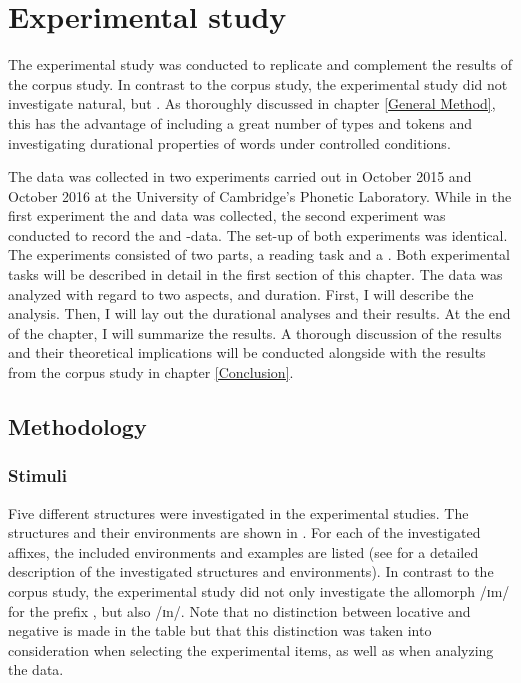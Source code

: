 \chapter{Experimental study} \label{Experimental Studies}


The experimental study was conducted to replicate and complement the results of the corpus study. In contrast to the corpus study, the experimental study did not investigate natural,  but . As thoroughly discussed in chapter \ref{General Method}, this has the advantage of including a great number of types and tokens and investigating durational properties of words under controlled conditions.

 The data was collected in two experiments carried out in October 2015 and October 2016 at the University of Cambridge's Phonetic Laboratory. While in the first experiment the  and data was collected, the second experiment was conducted to record the  and -data. 
  The set-up of both experiments was identical. The experiments consisted of two parts, a reading task and a . 
 Both experimental tasks will be described in detail in the first section of this chapter.
 The data was analyzed with regard to two aspects,  and duration. First, I will describe the  analysis.  Then, I will lay out the durational analyses and their results. At the end of the chapter, I will summarize the results. A thorough discussion of the results and their theoretical implications will be conducted alongside with the results from the corpus study in chapter \ref{Conclusion}.



\section{Methodology}


\subsection{Stimuli} \label{stimuli experiment}

 Five different structures were investigated in the experimental studies. The structures and their environments are shown in . For each of the investigated affixes, the included environments and examples are listed (see  for a detailed description of the investigated structures and environments). In contrast to the corpus study, the experimental study did not only investigate the allomorph /ɪm/ for the prefix , but also /ɪn/. Note that no distinction between locative and negative  is made in the table but that this distinction was taken into consideration when selecting the experimental items, as well as when analyzing the data.



